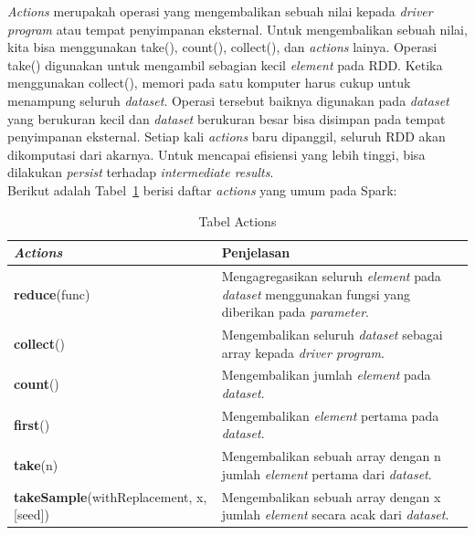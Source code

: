 \documentclass[a4paper,twoside]{article}
\begin{document}
\begin{enumerate}
\textit{Actions} merupakah operasi yang mengembalikan sebuah nilai kepada \textit{driver program} atau tempat penyimpanan eksternal. Untuk mengembalikan sebuah nilai, kita bisa menggunakan take(), count(), collect(), dan \textit{actions} lainya. Operasi take() digunakan untuk mengambil sebagian kecil \textit{element} pada RDD. Ketika menggunakan collect(), memori pada satu komputer harus cukup untuk menampung seluruh \textit{dataset}. Operasi tersebut baiknya digunakan pada \textit{dataset} yang berukuran kecil dan \textit{dataset} berukuran besar bisa disimpan pada tempat penyimpanan eksternal. Setiap kali \textit{actions} baru dipanggil, seluruh RDD akan dikomputasi dari akarnya. Untuk mencapai efisiensi yang lebih tinggi, bisa dilakukan \textit{persist} terhadap \textit{intermediate
results}. \\

Berikut adalah Tabel~\ref{tab:actions} berisi daftar \textit{actions} yang umum pada Spark:


\begin{table}[H] 
	\centering 
	\caption{Tabel Actions}
	\label{tab:actions}
	\begin{tabular}{p{6cm}p{9cm}	}

\hline
		 \textbf{\textit{Actions}} & Penjelasan \\
\hline


\hline
\textbf{reduce}(func) & Mengagregasikan seluruh \textit{element} pada \textit{dataset} menggunakan fungsi yang diberikan pada \textit{parameter}. \\

\hline
\textbf{collect}() & Mengembalikan seluruh \textit{dataset} sebagai array kepada \textit{driver program}. \\

\hline
\textbf{count}() & Mengembalikan jumlah \textit{element} pada \textit{dataset}. \\

\hline
\textbf{first}() & Mengembalikan \textit{element} pertama pada \textit{dataset}. \\

\hline
\textbf{take}(n) & Mengembalikan sebuah array dengan n jumlah \textit{element} pertama dari \textit{dataset}.\\

\hline
\textbf{takeSample}(withReplacement, x, [seed]) & Mengembalikan sebuah array dengan x jumlah \textit{element} secara acak dari \textit{dataset}. \\


\end{tabular}
\end{table}
\end{enumerate}
\end{document}
